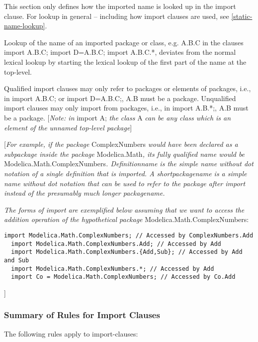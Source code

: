 This section only defines how the imported name is looked up in the
import clause. For lookup in general -- including how import clauses are
used, see \ref{static-name-lookup}.

Lookup of the name of an imported package or class, e.g. A.B.C in the
clauses import A.B.C; import D=A.B.C; import A.B.C.*, deviates from the
normal lexical lookup by starting the lexical lookup of the first part
of the name at the top-level.

Qualified import clauses may only refer to packages or elements of
packages, i.e., in import A.B.C; or import D=A.B.C;, A.B must be a
package. Unqualified import clauses may only import from packages, i.e.,
in import A.B.*;, A.B must be a package. {[}\emph{Note: in} import A;
\emph{the class} A \emph{can be any class which is an element of the
unnamed top-level package}{]}

{[}\emph{For example, if the package} ComplexNumbers \emph{would have
been declared as a subpackage inside the package} Modelica.Math\emph{,
its fully qualified name would be} Modelica.Math.ComplexNumbers\emph{.
Definitionname is the simple name without dot notation of a single
definition that is imported. A shortpackagename is a simple name without
dot notation that can be used to refer to the package after import
instead of the presumably much longer packagename.}

\emph{The forms of import are exemplified below assuming that we want to
access the addition operation of the hypothetical package}
Modelica.Math.ComplexNumbers:

\begin{lstlisting}[language=modelica]
  import Modelica.Math.ComplexNumbers; // Accessed by ComplexNumbers.Add
  import Modelica.Math.ComplexNumbers.Add; // Accessed by Add
  import Modelica.Math.ComplexNumbers.{Add,Sub}; // Accessed by Add and Sub
  import Modelica.Math.ComplexNumbers.*; // Accessed by Add
  import Co = Modelica.Math.ComplexNumbers; // Accessed by Co.Add
\end{lstlisting}
{]}

\subsubsection{Summary of Rules for Import Clauses}

The following rules apply to import-clauses:

